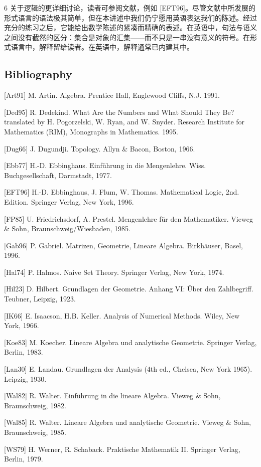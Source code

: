 6 关于逻辑的更详细讨论，读者可参阅文献，例如 [EFT96]。尽管文献中所发展的形式语言的语法极其简单，但在本讲述中我们仍宁愿用英语表达我们的陈述。经过充分的练习之后，它能给出数学陈述的紧凑而精确的表述。在英语中，句法与语义之间没有截然的区分：集合是对象的汇集——而不只是一串没有意义的符号。在形式语言中，解释留给读者。在英语中，解释通常已内建其中。

\subsection*{Bibliography}

[Art91] M. Artin. Algebra. Prentice Hall, Englewood Cliffs, N.J. 1991.

[Ded95] R. Dedekind. What Are the Numbers and What Should They Be? translated by H. Pogorzelski, W. Ryan, and W. Snyder. Research Institute for Mathematics (RIM), Monographs in Mathematics. 1995.

[Dug66] J. Dugundji. Topology. Allyn \& Bacon, Boston, 1966.

[Ebb77] H.-D. Ebbinghaus. Einführung in die Mengenlehre. Wiss. Buchgesellschaft, Darmstadt, 1977.

[EFT96] H.-D. Ebbinghaus, J. Flum, W. Thomas. Mathematical Logic, 2nd. Edition. Springer Verlag, New York, 1996.

[FP85] U. Friedrichsdorf, A. Prestel. Mengenlehre für den Mathematiker. Vieweg \& Sohn, Braunschweig/Wiesbaden, 1985.

[Gab96] P. Gabriel. Matrizen, Geometrie, Lineare Algebra. Birkhäuser, Basel, 1996.

[Hal74] P. Halmos. Naive Set Theory. Springer Verlag, New York, 1974.

[Hil23] D. Hilbert. Grundlagen der Geometrie. Anhang VI: Über den Zahlbegriff. Teubner, Leipzig, 1923.

[IK66] E. Isaacson, H.B. Keller. Analysis of Numerical Methods. Wiley, New York, 1966.

[Koe83] M. Koecher. Lineare Algebra und analytische Geometrie. Springer Verlag, Berlin, 1983.

[Lan30] E. Landau. Grundlagen der Analysis (4th ed., Chelsea, New York 1965). Leipzig, 1930.

[Wal82] R. Walter. Einführung in die lineare Algebra. Vieweg \& Sohn, Braunschweig, 1982.

[Wal85] R. Walter. Lineare Algebra und analytische Geometrie. Vieweg \& Sohn, Braunschweig, 1985.

[WS79] H. Werner, R. Schaback. Praktische Mathematik II. Springer Verlag, Berlin, 1979.
